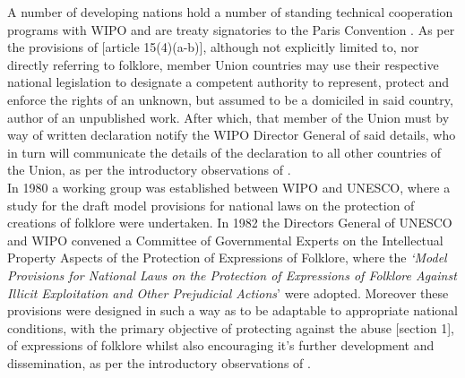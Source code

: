 \documentclass[11pt]{article}
\begin{document}
A number of developing nations hold a number of standing technical cooperation
programs with WIPO \cite{wto17_trips} and are treaty signatories to the Paris
Convention \cite{wipo83_paris_conve_protect_ip}. As per the provisions of [article
15(4)(a-b)]\cite{wipo86_berne}, although not explicitly limited to, nor directly
referring to folklore, member Union countries may use their respective national
legislation to designate a competent authority to represent, protect and enforce
the rights of an unknown, but assumed to be a domiciled in said country, author
of an unpublished work. After which, that member of the Union must by way of
written declaration notify the WIPO Director General of said details, who in
turn will communicate the details of the declaration to all other countries of
the Union, as per the introductory observations of
\cite{wipo85_model_provi_national_laws_folklore}.\\

In 1980 a working group was established between WIPO and UNESCO, where a study
for the draft model provisions for national laws on the protection of creations
of folklore were undertaken. In 1982 the Directors General of UNESCO and WIPO
convened a Committee of Governmental Experts on the Intellectual Property
Aspects of the Protection of Expressions of Folklore, where the \emph{`Model Provisions for National Laws on the Protection of Expressions of Folklore
Against Illicit Exploitation and Other Prejudicial Actions}' were adopted.
Moreover these provisions were designed in such a way as to be adaptable to
appropriate national conditions, with the primary objective of protecting
against the abuse [section 1]\cite{wipo85_model_provi_national_laws_folklore}, of
expressions of folklore whilst also encouraging it's further development and
dissemination, as per the introductory observations of
\cite{wipo85_model_provi_national_laws_folklore}.\\
\end{document}
